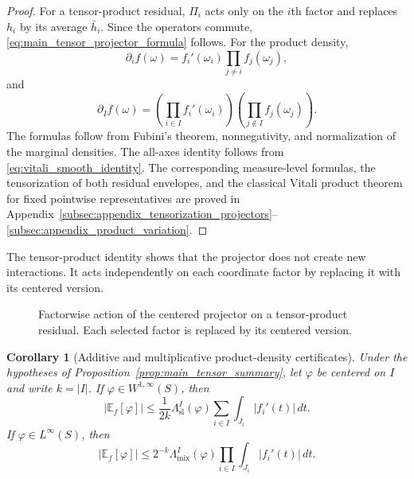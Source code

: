 \documentclass[11pt,letterpaper]{article}
\newtheorem{corollary}[theorem]{Corollary}
\theoremstyle{definition}
\theoremstyle{remark}
\newcommand{\Id}{\mathrm{Id}}
\begin{document}
\begin{proof}
For a tensor-product residual, $\Pi_i$ acts only on the $i$th factor and
replaces $h_i$ by its average $\bar h_i$. Since the operators commute,
\eqref{eq:main_tensor_projector_formula} follows. For the product density,
$$
\partial_i f(\omega)
=
f_i'(\omega_i)\prod_{j\neq i}f_j(\omega_j),
$$
and
$$
\partial_I f(\omega)
=
\left(\prod_{i\in I}f_i'(\omega_i)\right)
\left(\prod_{j\notin I}f_j(\omega_j)\right).
$$
The formulas follow from Fubini's theorem, nonnegativity, and normalization of
the marginal densities. The all-axes identity follows from
\eqref{eq:vitali_smooth_identity}. The corresponding measure-level formulas,
the tensorization of both residual envelopes, and the classical Vitali product
theorem for fixed pointwise representatives are proved in
Appendix~\ref{subsec:appendix_tensorization_projectors}--\ref{subsec:appendix_product_variation}.
\end{proof}
The tensor-product identity shows that the projector does not create new
interactions. It acts independently on each coordinate factor by replacing it
with its centered version.
\begin{figure}[t]
\centering
{}

\caption{
Factorwise action of the centered projector on a tensor-product residual.
Each selected factor is replaced by its centered version.
}
\label{fig:tensor_projector_geometry}
\end{figure}

\begin{corollary}[Additive and multiplicative product-density certificates]
\label{cor:main_additive_multiplicative_certificates}
Under the hypotheses of Proposition~\ref{prop:main_tensor_summary}, let
$\varphi$ be centered on $I$ and write $k=|I|$. If
$\varphi\in W^{1,\infty}(S)$, then
\begin{equation}
\label{eq:main_product_tv_certificate}
|\mathbb E_f[\varphi]|
\le
\frac{1}{2k}\Lambda_{\mathrm{sl}}^I(\varphi)
\sum_{i\in I}\int_{J_i}|f_i'(t)|\,dt.
\end{equation}
If $\varphi\in L^\infty(S)$, then
\begin{equation}
\label{eq:main_product_mixed_certificate}
|\mathbb E_f[\varphi]|
\le
2^{-k}\Lambda_{\mathrm{mix}}^I(\varphi)
\prod_{i\in I}\int_{J_i}|f_i'(t)|\,dt.
\end{equation}
\end{corollary}
\end{document}
